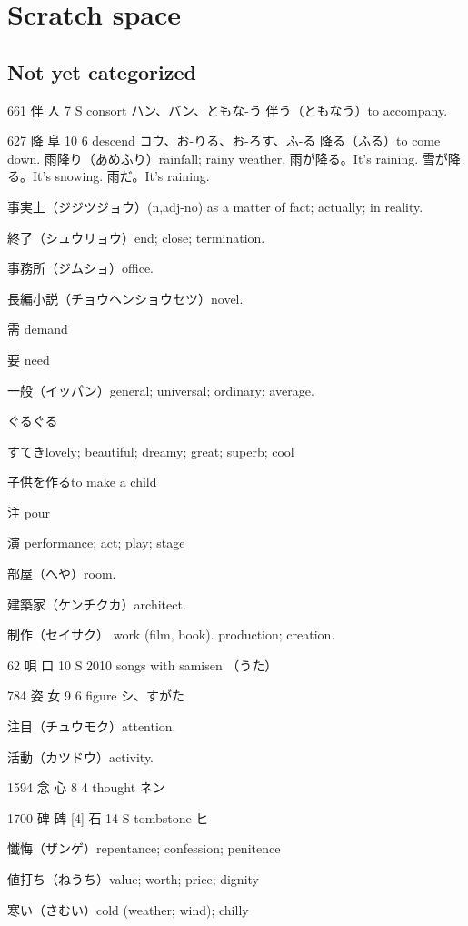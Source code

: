 \chapter{Scratch space}

\section{Not yet categorized}

661	伴		人	7	S		consort	ハン、バン、ともな-う
伴う（ともなう）to accompany.

627	降		阜	10	6		descend	コウ、お-りる、お-ろす、ふ-る
降る（ふる）to come down.
雨降り（あめふり）rainfall; rainy weather.
雨が降る。It's raining.
雪が降る。It's snowing.
雨だ。It's raining.

事実上（ジジツジョウ）(n,adj-no)
as a matter of fact; actually; in reality.

終了（シュウリョウ）end; close; termination.

事務所（ジムショ）office.

長編小説（チョウヘンショウセツ）novel.

需 demand

要 need

一般（イッパン）general; universal; ordinary; average.

ぐるぐる

すてきlovely; beautiful; dreamy; great; superb; cool


子供を作るto make a child

注 pour

演 performance; act; play; stage

部屋（へや）room.

建築家（ケンチクカ）architect.

制作（セイサク）
work (film, book).
production; creation.

62	唄		口	10	S	2010	songs with samisen	（うた）

784	姿		女	9	6		figure	シ、すがた

注目（チュウモク）attention.

活動（カツドウ）activity.

1594	念		心	8	4		thought	ネン

1700	碑	碑 [4]	石	14	S		tombstone	ヒ

懺悔（ザンゲ）repentance; confession; penitence

値打ち（ねうち）value; worth; price; dignity

寒い（さむい）cold (weather; wind); chilly
